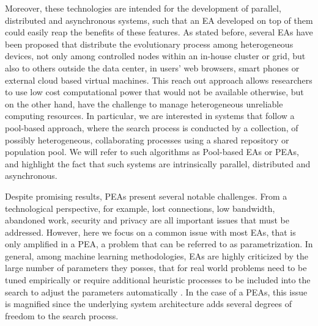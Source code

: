 \documentclass{llncs}
\begin{document}
Moreover, these technologies are intended for the development of parallel, distributed and asynchronous systems,
such that an EA developed on top of them could easily reap the benefits of these features.
As stated before, several EAs have been proposed that distribute  the evolutionary process among heterogeneous devices, not only among controlled
nodes within an in-house cluster or grid, but also to others outside the data center, in users' web browsers, smart phones or external cloud based virtual machines.
This reach out approach allows researchers to use low cost computational 
power that would not be available otherwise, but on the other hand, have the 
challenge to manage heterogeneous unreliable computing resources. 
In particular, we are interested in systems that follow a pool-based approach, where the search process is conducted
by a collection, of possibly heterogeneous, collaborating processes using a shared repository or population pool.
We will refer to such algorithms as Pool-based EAs or PEAs, and highlight the fact that such systems are
intrinsically parallel, distributed and asynchronous.

Despite promising results, PEAs present several notable challenges. From a technological perspective, for example, lost 
connections, low bandwidth, abandoned work, security and privacy are all important issues that must be addressed. 
However, here we focus on a common issue with most EAs, that is only amplified in a PEA, a problem that can be referred to as parametrization.
In general, among machine learning methodologies, EAs are highly criticized by the large number of parameters they posses,
that for real world problems need to be tuned empirically or require additional heuristic processes to be included into the search to
adjust the parameters automatically \cite{ss}.
In the case of a PEAs, this issue is magnified since the underlying system architecture adds several degrees of freedom to the search process.
\end{document}
